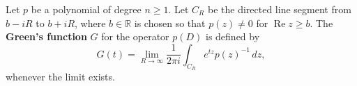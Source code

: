 Let $p$ be a polynomial of degree $n \geq 1$. Let $C_R$ be the directed line segment from $b - iR$ to $b + iR$, where $b \in \mathbb{R}$ is chosen so that $p(z) \neq 0$ for $\operatorname{Re} z \geq b$. The \textbf{Green's function} $G$ for the operator $p(D)$ is defined by
$$G(t) = \lim_{R \to \infty} \frac{1}{2\pi i} \int_{C_R} e^{tz} p(z)^{-1} \, dz,$$
whenever the limit exists.
